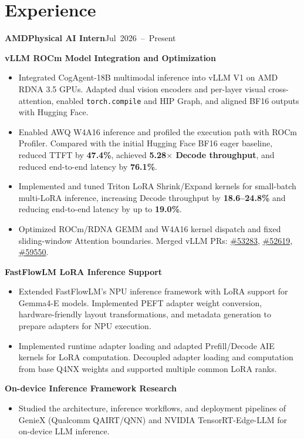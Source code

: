 \documentclass[10pt,a4paper]{article}
\newcommand{\entry}[2]{\par\noindent\textbf{#1}\hfill\mbox{#2}\par}
\newcommand{\pr}[2]{\href{https://github.com/#1/pull/#2}{\##2}}
\begin{document}
\section{Experience}
\entry{AMD\hspace{1em}Physical AI Intern}{Jul 2026 -- Present}
\textbf{vLLM ROCm Model Integration and Optimization}
\begin{itemize}
  \item Integrated CogAgent-18B multimodal inference into vLLM V1 on AMD RDNA 3.5 GPUs.
  Adapted dual vision encoders and per-layer visual cross-attention, enabled \texttt{torch.compile} and HIP Graph,
  and aligned BF16 outputs with Hugging Face.
  \item Enabled AWQ W4A16 inference and profiled the execution path with ROCm Profiler.
  Compared with the initial Hugging Face BF16 eager baseline, reduced TTFT by \textbf{47.4\%}, achieved
  \textbf{5.28$\times$ Decode throughput}, and reduced end-to-end latency by \textbf{76.1\%}.
  \item Implemented and tuned Triton LoRA Shrink/Expand kernels for small-batch multi-LoRA inference,
  increasing Decode throughput by \textbf{18.6--24.8\%} and reducing end-to-end latency by up to \textbf{19.0\%}.
  \item Optimized ROCm/RDNA GEMM and W4A16 kernel dispatch and fixed sliding-window Attention boundaries.
  Merged vLLM PRs: \pr{vllm-project/vllm}{53283}, \pr{vllm-project/vllm}{52619}, \pr{vllm-project/vllm}{59550}.
\end{itemize}
\textbf{FastFlowLM LoRA Inference Support}
\begin{itemize}
  \item Extended FastFlowLM's NPU inference framework with LoRA support for Gemma4-E models.
  Implemented PEFT adapter weight conversion, hardware-friendly layout transformations, and metadata generation
  to prepare adapters for NPU execution.
  \item Implemented runtime adapter loading and adapted Prefill/Decode AIE kernels for LoRA computation.
  Decoupled adapter loading and computation from base Q4NX weights and supported multiple common LoRA ranks.
\end{itemize}

\textbf{On-device Inference Framework Research}
\begin{itemize}
  \item Studied the architecture, inference workflows, and deployment pipelines of GenieX (Qualcomm QAIRT/QNN)
  and NVIDIA TensorRT-Edge-LLM for on-device LLM inference.
\end{itemize}
\end{document}
